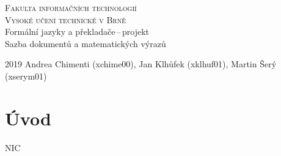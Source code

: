 \documentclass[10pt, a4paper]{article}
\begin{document}
\begin{center}
    \thispagestyle{empty}
    \Huge
    \textsc{Fakulta informačních technologií\\Vysoké učení technické v Brně}\\
    \LARGE{Formální jazyky a překladače\,--\,projekt\\
    Sazba dokumentů a matematických výrazů}
\end{center}
{\Large 2019 \hfill Andrea Chimenti (xchime00), Jan Klhůfek (xklhuf01), Martin Šerý (xserym01)}

\section{Úvod}
NIC
\end{document}
